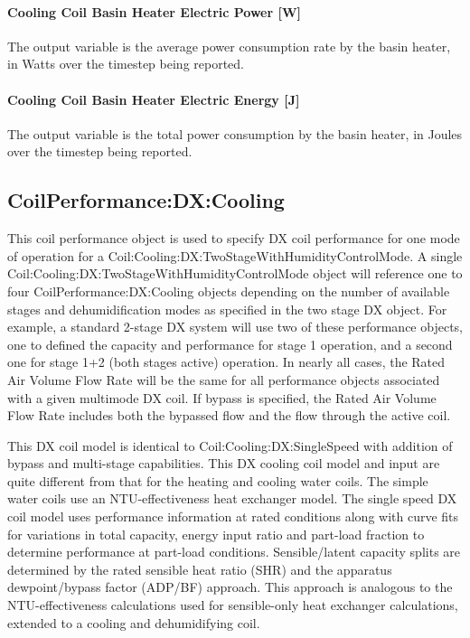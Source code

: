 \paragraph{Cooling Coil Basin Heater Electric Power {[}W{]}}\label{cooling-coil-basin-heater-electric-power-w-1}

The output variable is the average power consumption rate by the basin heater, in Watts over the timestep being reported.

\paragraph{Cooling Coil Basin Heater Electric Energy {[}J{]}}\label{cooling-coil-basin-heater-electric-energy-j-1}

The output variable is the total power consumption by the basin heater, in Joules over the timestep being reported.

\subsection{CoilPerformance:DX:Cooling}\label{coilperformancedxcooling}

This coil performance object is used to specify DX coil performance for one mode of operation for a Coil:Cooling:DX:TwoStageWithHumidityControlMode. A single Coil:Cooling:DX:TwoStageWithHumidityControlMode object will reference one to four CoilPerformance:DX:Cooling objects depending on the number of available stages and dehumidification modes as specified in the two stage DX object. For example, a standard 2-stage DX system will use two of these performance objects, one to defined the capacity and performance for stage 1 operation, and a second one for stage 1+2 (both stages active) operation. In nearly all cases, the Rated Air Volume Flow Rate will be the same for all performance objects associated with a given multimode DX coil. If bypass is specified, the Rated Air Volume Flow Rate includes both the bypassed flow and the flow through the active coil.

This DX coil model is identical to Coil:Cooling:DX:SingleSpeed with addition of bypass and multi-stage capabilities. This DX cooling coil model and input are quite different from that for the heating and cooling water coils. The simple water coils use an NTU-effectiveness heat exchanger model. The single speed DX coil model uses performance information at rated conditions along with curve fits for variations in total capacity, energy input ratio and part-load fraction to determine performance at part-load conditions. Sensible/latent capacity splits are determined by the rated sensible heat ratio (SHR) and the apparatus dewpoint/bypass factor (ADP/BF) approach. This approach is analogous to the NTU-effectiveness calculations used for sensible-only heat exchanger calculations, extended to a cooling and dehumidifying coil.

